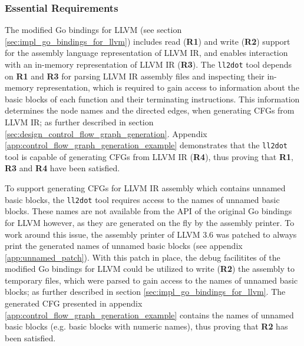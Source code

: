 
\subsubsection{Essential Requirements}
\label{sec:eval_llvm_ir_library_essential_requirements}


The modified Go bindings for LLVM (see section \ref{sec:impl_go_bindings_for_llvm}) includes read (\textbf{R1}) and write (\textbf{R2}) support for the assembly language representation of LLVM IR, and enables interaction with an in-memory representation of LLVM IR (\textbf{R3}). The \texttt{ll2dot} tool depends on \textbf{R1} and \textbf{R3} for parsing LLVM IR assembly files and inspecting their in-memory representation, which is required to gain access to information about the basic blocks of each function and their terminating instructions. This information determines the node names and the directed edges, when generating CFGs from LLVM IR; as further described in section \ref{sec:design_control_flow_graph_generation}. Appendix \ref{app:control_flow_graph_generation_example} demonstrates that the \texttt{ll2dot} tool is capable of generating CFGs from LLVM IR (\textbf{R4}), thus proving that \textbf{R1}, \textbf{R3} and \textbf{R4} have been satisfied.


To support generating CFGs for LLVM IR assembly which contains unnamed basic blocks, the \texttt{ll2dot} tool requires access to the names of unnamed basic blocks. These names are not available from the API of the original Go bindings for LLVM however, as they are generated on the fly by the assembly printer. To work around this issue, the assembly printer of LLVM 3.6 was patched to always print the generated names of unnamed basic blocks (see appendix \ref{app:unnamed_patch}). With this patch in place, the debug facilitites of the modified Go bindings for LLVM could be utilized to write (\textbf{R2}) the assembly to temporary files, which were parsed to gain access to the names of unnamed basic blocks; as further described in section \ref{sec:impl_go_bindings_for_llvm}. The generated CFG presented in appendix \ref{app:control_flow_graph_generation_example} contains the names of unnamed basic blocks (e.g. basic blocks with numeric names), thus proving that \textbf{R2} has been satisfied.
